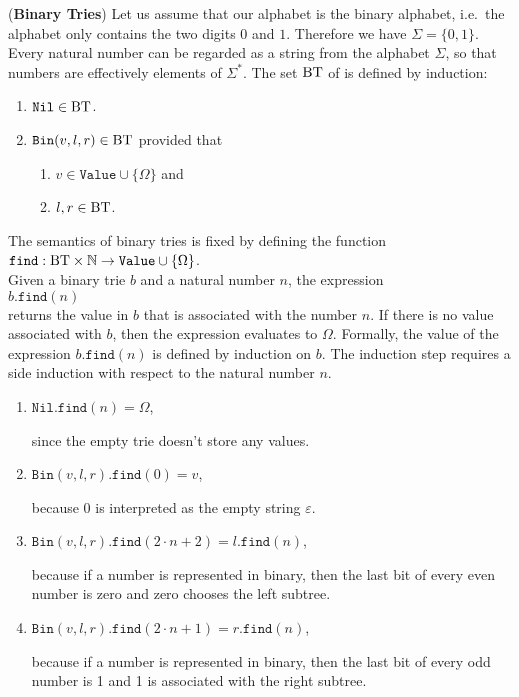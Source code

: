\exercise
(\textbf{Binary Tries})  Let us assume that our alphabet is the binary alphabet, i.e.~the alphabet
only contains the two digits $0$ and $1$.  Therefore we have $\Sigma = \{0,1\}$.  Every natural
number can be regarded as a string from the alphabet $\Sigma$, so that numbers are effectively
elements of $\Sigma^*$.  The set $\mathrm{BT}$ of  is defined by induction:
\begin{enumerate}
\item $\mathtt{Nil} \in \mathrm{BT}$.
\item $\mathtt{Bin}(v,l,r) \in \mathrm{BT}$ provided that
      \begin{enumerate}
      \item $v \in \mathtt{Value} \cup \{\Omega\}$ \quad and
      \item $l,r \in \mathrm{BT}$.
      \end{enumerate}
\end{enumerate}
The semantics of binary tries is fixed by defining the function
\\[0.2cm]
\hspace*{1.3cm}
$\mathtt{find}: \mathrm{BT} \times \mathbb{N} \rightarrow \mathtt{Value} \cup \{ \Omega \}$.
\\[0.2cm]
Given a binary trie $b$ and a natural number $n$, the expression
\\[0.2cm]
\hspace*{1.3cm}
$b.\mathtt{find}(n)$ 
\\[0.2cm]
returns the value in $b$ that is associated with the number $n$.  If there is no value associated
with $b$, then the expression evaluates to $\Omega$.  Formally, the value of the expression
 $b.\mathtt{find}(n)$ is defined by induction on $b$.  The induction step requires a side induction
 with respect to the natural number $n$.
\begin{enumerate}
\item $\mathtt{Nil}.\mathtt{find}(n) = \Omega$,

      since the empty trie doesn't store any values.
\item $\mathtt{Bin}(v,l,r).\mathtt{find}(0) = v$,

      because $0$ is interpreted as the empty string $\varepsilon$.
\item $\mathtt{Bin}(v,l,r).\mathtt{find}(2\cdot n + 2) = l.\mathtt{find}(n)$,

      because if a number is represented in binary, then the last bit of every even number is zero
      and zero chooses the left subtree.
\item $\mathtt{Bin}(v,l,r).\mathtt{find}(2 \cdot n + 1) = r.\mathtt{find}(n)$,

      because if a number is represented in binary, then the last bit of every odd number is 1 and 
      1 is associated with the right subtree.
\end{enumerate}
